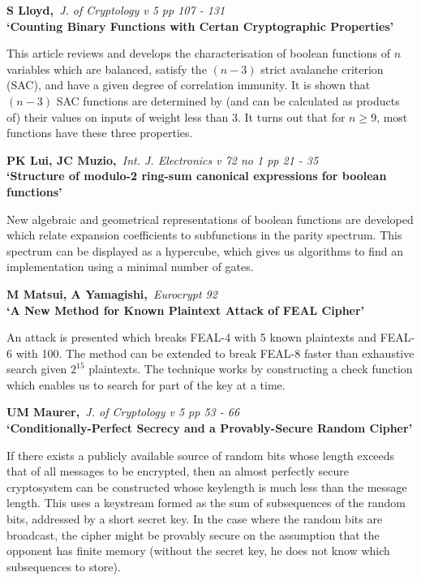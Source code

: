 \pagebreak

{\bf \noindent S Lloyd,}{\em ~J. of Cryptology v 5 pp 107 - 131\\}
{\bf `Counting Binary Functions with Certan Cryptographic Properties'}

This article reviews and develops the characterisation of boolean functions
of $n$ variables which are balanced, satisfy the $(n-3)$ strict avalanche
criterion (SAC), and have a given degree of correlation immunity. It is shown 
that $(n-3)$ SAC functions are determined by (and can be calculated as 
products of) their values on inputs of weight less than 3. It turns out that
for $n \geq 9$, most functions have these three properties.

{\bf \noindent PK Lui, JC Muzio,}{\em ~Int. J. Electronics v 72 no 1 pp 21 - 
35\\}
{\bf `Structure of modulo-2 ring-sum canonical expressions for boolean 
functions'}

New algebraic and geometrical representations of boolean functions are
developed which relate expansion coefficients to subfunctions in the parity
spectrum. This spectrum can be displayed as a hypercube, which gives us
algorithms to find an implementation using a minimal number of gates.

{\bf \noindent M Matsui, A Yamagishi,}{\em ~Eurocrypt 92\\}
{\bf `A New Method for Known Plaintext Attack of FEAL Cipher'}

An attack is presented which breaks FEAL-4 with 5 known plaintexts and FEAL-6 
with 100. The method can be extended to break FEAL-8 faster than exhaustive 
search given $2^{15}$ plaintexts. The technique works by constructing 
a check function which enables us to search for part of the key at a time.

{\bf \noindent UM Maurer,}{\em ~J. of Cryptology v 5 pp 53 - 66\\}
{\bf `Conditionally-Perfect Secrecy and a Provably-Secure Random Cipher'}

If there exists a publicly available source of random bits whose length
exceeds that of all messages to be encrypted, then an almost perfectly secure
cryptosystem can be constructed whose keylength is much less than the message
length. This uses a keystream formed as the sum of subsequences of the random
bits, addressed by a short secret key. In the case where the random bits are
broadcast, the cipher might be provably secure on the assumption that the
opponent has finite memory (without the secret key, he does not know which
subsequences to store).


